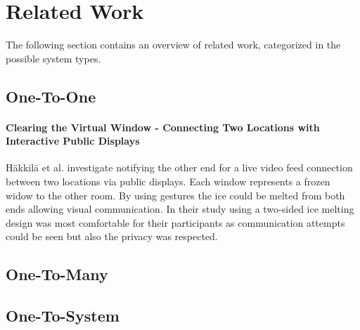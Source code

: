 \section{Related Work}
The following section contains an overview of related work, categorized in the possible system types.

\subsection{One-To-One}

\paragraph{Clearing the Virtual Window - Connecting Two Locations
with Interactive Public Displays }
Häkkilä et al. \cite{hakkila_clearing_2013} investigate notifying the other end for a live video feed connection between two locations via public displays.
Each window represents a frozen widow to the other room.
By using gestures the ice could be melted from both ends allowing visual communication.
In their study using a two-sided ice melting design was most comfortable for their participants as communication attempts could be seen but also the privacy was respected.

\subsection{One-To-Many}

\subsection{One-To-System}

